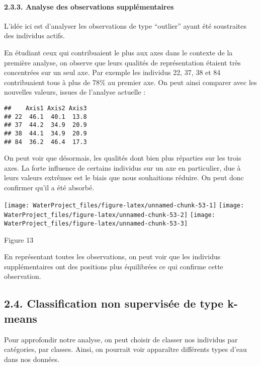 \documentclass[]{article}
\let\oldparagraph\paragraph
\renewcommand{\paragraph}[1]{\oldparagraph{#1}\mbox{}}
\begin{document}
\hypertarget{analyse-des-observations-supplementaires-1}{\paragraph{2.3.3.
Analyse des observations
supplémentaires}\label{analyse-des-observations-supplementaires-1}}

L'idée ici est d'analyser les observations de type ``outlier'' ayant été
soustraites des individus actifs.

En étudiant ceux qui contribuaient le plus aux axes dans le contexte de
la première analyse, on observe que leurs qualités de représentation
étaient très concentrées sur un seul axe. Par exemple les individus 22,
37, 38 et 84 contribuaient tous à plus de 78\% au premier axe. On peut
ainsi comparer avec les nouvelles valeurs, issues de l'analyse actuelle
:

\begin{verbatim}
##    Axis1 Axis2 Axis3
## 22  46.1  40.1  13.8
## 37  44.2  34.9  20.9
## 38  44.1  34.9  20.9
## 84  36.2  46.4  17.3
\end{verbatim}

On peut voir que désormais, les qualités dont bien plus réparties sur
les trois axes. La forte influence de certains individus sur un axe en
particulier, due à leurs valeurs extrêmes est le biais que nous
souhaitions réduire. On peut donc confirmer qu'il a été absorbé.

\texttt{[image: WaterProject\_files/figure-latex/unnamed-chunk-53-1]}
\texttt{[image: WaterProject\_files/figure-latex/unnamed-chunk-53-2]}
\texttt{[image: WaterProject\_files/figure-latex/unnamed-chunk-53-3]}

Figure 13

En représentant toutes les observations, on peut voir que les individus
supplémentaires ont des positions plus équilibrées ce qui confirme cette
observation.

\hypertarget{classification-non-supervisee-de-type-k-means}{\subsection{2.4.
Classification non supervisée de type
k-means}\label{classification-non-supervisee-de-type-k-means}}

Pour approfondir notre analyse, on peut choisir de classer nos individus
par catégories, par classes. Ainsi, on pourrait voir apparaître
différents types d'eau dans nos données.
\end{document}

